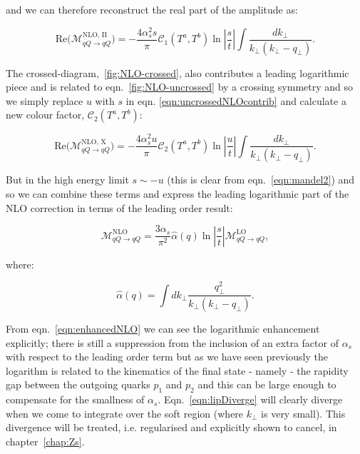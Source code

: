 	and we can therefore reconstruct the real part of the amplitude as:

	\begin{equation}
		\text{Re}\Big(\mathcal{M}_{qQ\rightarrow qQ}^{\text{NLO, II}}\Big) =
		-\frac{4\alpha_s^2s}{\pi} \mathcal{C}_1(T^a,T^b)
		\ln\left|\frac{s}{t}\right|\int \frac{dk_{\perp}}{k_{\perp}(k_{\perp} - q_{\perp})}.
		\label{eqn:uncrossedNLOcontrib}
	\end{equation}

	The crossed-diagram,~\eqref{fig:NLO-crossed}, also contributes a leading logarithmic piece and is related to
	eqn.~\eqref{fig:NLO-uncrossed} by a crossing symmetry and so we simply replace $u$ with $s$ in eqn.
	\eqref{eqn:uncrossedNLOcontrib} and calculate a new colour factor, $\mathcal{C}_2(T^a,T^b)$:

	\begin{equation}
		\text{Re}\Big(\mathcal{M}_{qQ\rightarrow qQ}^{\text{NLO, X}}\Big) =
		-\frac{4\alpha_s^2u}{\pi} \mathcal{C}_2(T^a,T^b)
		\ln\left|\frac{u}{t}\right| \int \frac{dk_{\perp}}{k_{\perp}(k_{\perp} - q_{\perp})}.
		\label{eqn:crossedNLOcontrib}
	\end{equation}

	But in the high energy limit $s\sim -u$ (this is clear from eqn.~\eqref{eqn:mandel2}) and so we
	can combine these terms and express the leading logarithmic part of the NLO correction in terms of the leading order
	result:

	\begin{equation}
		\mathcal{M}_{qQ\rightarrow qQ}^{\text{NLO}} = \frac{3\alpha_s}{\pi^2}
		\hat{\alpha}(q)\ln\left|\frac{s}{t}\right|
		\mathcal{M}_{qQ\rightarrow qQ}^{\text{LO}},
		\label{eqn:enhancedNLO}
	\end{equation}

	where:

	\begin{equation}
		\hat{\alpha}(q) = \int dk_{\perp}\frac{q_{\perp}^2}{k_{\perp}(k_{\perp} - q_{\perp})}.
		\label{eqn:lipDiverge}
	\end{equation}

	From eqn.~\eqref{eqn:enhancedNLO} we can see the logarithmic enhancement explicitly; there is still
	a suppression from the inclusion of an extra factor of $\alpha_s$ with respect to the leading
	order term but as we have seen previously the logarithm is related to the kinematics of the final
	state - namely - the rapidity gap between the outgoing quarks $p_1$ and $p_2$ and this can be large enough to compensate
	for the smallness of $\alpha_s$.  Eqn.~\eqref{eqn:lipDiverge} will clearly diverge when we
	come to integrate over the soft region (where $k_\perp$ is very small).  This divergence
	will be treated, i.e. regularised and explicitly shown to cancel, in chapter~\ref{chap:Zs}.


